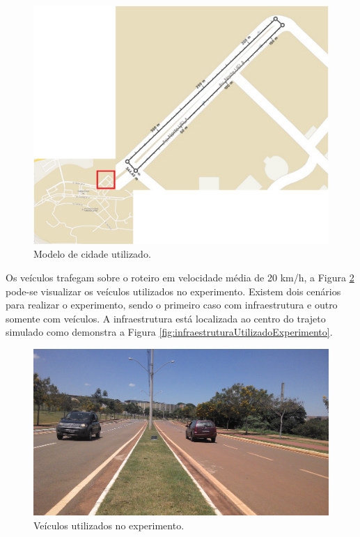 \begin{figure}[htbp]
	\centering
	\includegraphics[scale=0.4]{metodologia/figuras/trajetoExperimento.pdf}
	\caption{Modelo de cidade utilizado.}
	\label{fig:trajetoExperimento}
\end{figure}

Os veículos trafegam sobre o roteiro em velocidade média de 20 km/h, a Figura \ref{fig:veiculosUtilizadoExperimento} pode-se visualizar os veículos utilizados no experimento. Existem dois cenários para realizar o experimento, sendo o primeiro caso com infraestrutura e outro somente com veículos. A infraestrutura está localizada ao centro do trajeto simulado como demonstra a Figura \ref{fig:infraestruturaUtilizadoExperimento}.

\begin{figure}[htbp]
	\centering
	\includegraphics[scale=0.06]{metodologia/figuras/veiculosUtilizadoExperimento.jpg}
	\caption{Veículos utilizados no experimento.}
	\label{fig:veiculosUtilizadoExperimento}
\end{figure}

